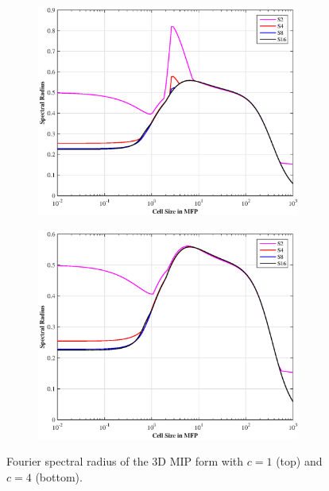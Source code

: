 \begin{figure}
\centering
	\begin{subfigure}[b]{0.80\textwidth}
		\centering
		\includegraphics[width=0.95\textwidth]{figures/sec_DSA/SI_MIP_hex_C=1_PWLD_LS.eps}
	\end{subfigure}
	\vfill
	\begin{subfigure}[b]{0.80\textwidth}
		\centering
		\includegraphics[width=0.95\textwidth]{figures/sec_DSA/SI_MIP_hex_C=4_PWLD_LS.eps}
	\end{subfigure}
\caption{Fourier spectral radius of the 3D MIP form with $c=1$ (top) and $c=4$ (bottom).}
\label{fig::DSA_3D1G_Fourier}
\end{figure}

